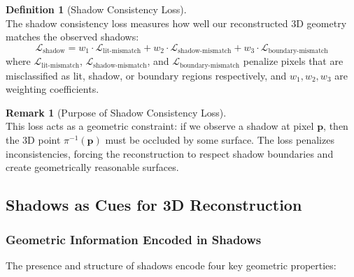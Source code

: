 \documentclass[12pt]{article}
\newcommand{\vect}[1]{\bm{#1}}
\theoremstyle{definition}
\newtheorem{definition}{Definition}[subsection]
\newtheorem{remark}{Remark}[subsection]
\begin{document}
\begin{definition}[Shadow Consistency Loss] ~\\
The shadow consistency loss measures how well our reconstructed 3D geometry matches the observed shadows:
\begin{equation}
\mathcal{L}_{\text{shadow}} = w_1 \cdot \mathcal{L}_{\text{lit-mismatch}} + w_2 \cdot \mathcal{L}_{\text{shadow-mismatch}} + w_3 \cdot \mathcal{L}_{\text{boundary-mismatch}}
\end{equation}
where $\mathcal{L}_{\text{lit-mismatch}}$, $\mathcal{L}_{\text{shadow-mismatch}}$, and $\mathcal{L}_{\text{boundary-mismatch}}$ penalize pixels that are misclassified as lit, shadow, or boundary regions respectively, and $w_1, w_2, w_3$ are weighting coefficients.
\end{definition}

\begin{remark}[Purpose of Shadow Consistency Loss] ~\\
This loss acts as a geometric constraint: if we observe a shadow at pixel $\vect{p}$, then the 3D point $\pi^{-1}(\vect{p})$ must be occluded by some surface. The loss penalizes inconsistencies, forcing the reconstruction to respect shadow boundaries and create geometrically reasonable surfaces.
\end{remark}

\subsection{Shadows as Cues for 3D Reconstruction}

\subsubsection*{Geometric Information Encoded in Shadows}

The presence and structure of shadows encode four key geometric properties:
\end{document}
